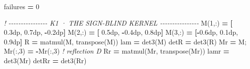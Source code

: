 \documentclass[10pt]{article}
\renewcommand{\_}{\origunderscore\allowbreak}
\newenvironment{Shaded}{}{}
\newcommand{\CommentTok}[1]{\textit{#1}}
\newcommand{\DecValTok}[1]{#1}
\newcommand{\FloatTok}[1]{#1}
\newcommand{\FunctionTok}[1]{#1}
\newcommand{\KeywordTok}[1]{\textbf{#1}}
\newcommand{\NormalTok}[1]{#1}
\begin{document}
\begin{Shaded}
\begin{Highlighting}[]
\NormalTok{  failures }\KeywordTok{=} \DecValTok{0}

  \CommentTok{! {-}{-}{-}{-}{-}{-}{-}{-}{-}{-}{-}{-}{-}{-}{-}{-} K1 · THE SIGN{-}BLIND KERNEL {-}{-}{-}{-}{-}{-}{-}{-}{-}{-}{-}{-}{-}{-}{-}{-}}
\NormalTok{  M(}\DecValTok{1}\NormalTok{,:) }\KeywordTok{=} \KeywordTok{[} \FloatTok{0.3\_dp}\NormalTok{,  }\FloatTok{0.7\_dp}\NormalTok{, }\KeywordTok{{-}}\FloatTok{0.2\_dp}\KeywordTok{]}
\NormalTok{  M(}\DecValTok{2}\NormalTok{,:) }\KeywordTok{=} \KeywordTok{[} \FloatTok{0.5\_dp}\NormalTok{, }\KeywordTok{{-}}\FloatTok{0.4\_dp}\NormalTok{,  }\FloatTok{0.8\_dp}\KeywordTok{]}
\NormalTok{  M(}\DecValTok{3}\NormalTok{,:) }\KeywordTok{=} \KeywordTok{[{-}}\FloatTok{0.6\_dp}\NormalTok{,  }\FloatTok{0.1\_dp}\NormalTok{,  }\FloatTok{0.9\_dp}\KeywordTok{]}
\NormalTok{  R  }\KeywordTok{=} \FunctionTok{matmul}\NormalTok{(M, }\FunctionTok{transpose}\NormalTok{(M))}
\NormalTok{  lam  }\KeywordTok{=}\NormalTok{ det3(M)}
\NormalTok{  detR }\KeywordTok{=}\NormalTok{ det3(R)}
\NormalTok{  Mr }\KeywordTok{=}\NormalTok{ M; Mr(:,}\DecValTok{3}\NormalTok{) }\KeywordTok{=} \KeywordTok{{-}}\NormalTok{Mr(:,}\DecValTok{3}\NormalTok{)                            }\CommentTok{! reflection D}
\NormalTok{  Rr }\KeywordTok{=} \FunctionTok{matmul}\NormalTok{(Mr, }\FunctionTok{transpose}\NormalTok{(Mr))}
\NormalTok{  lamr  }\KeywordTok{=}\NormalTok{ det3(Mr)}
\NormalTok{  detRr }\KeywordTok{=}\NormalTok{ det3(Rr)}


\end{Highlighting}
\end{Shaded}
\end{document}
